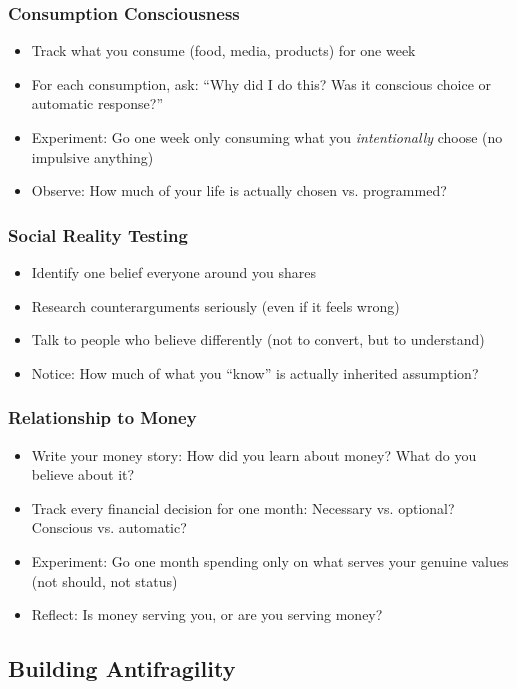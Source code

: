 \documentclass[11pt,a4paper]{article}
\theoremstyle{definition}
\theoremstyle{remark}
\begin{document}
\subsubsection{Consumption Consciousness}
\begin{itemize}
    \item Track what you consume (food, media, products) for one week
    \item For each consumption, ask: ``Why did I do this? Was it conscious choice or automatic response?''
    \item Experiment: Go one week only consuming what you \textit{intentionally} choose (no impulsive anything)
    \item Observe: How much of your life is actually chosen vs. programmed?
\end{itemize}

\subsubsection{Social Reality Testing}
\begin{itemize}
    \item Identify one belief everyone around you shares
    \item Research counterarguments seriously (even if it feels wrong)
    \item Talk to people who believe differently (not to convert, but to understand)
    \item Notice: How much of what you ``know'' is actually inherited assumption?
\end{itemize}

\subsubsection{Relationship to Money}
\begin{itemize}
    \item Write your money story: How did you learn about money? What do you believe about it?
    \item Track every financial decision for one month: Necessary vs. optional? Conscious vs. automatic?
    \item Experiment: Go one month spending only on what serves your genuine values (not should, not status)
    \item Reflect: Is money serving you, or are you serving money?
\end{itemize}

\subsection{Building Antifragility}
\end{document}
